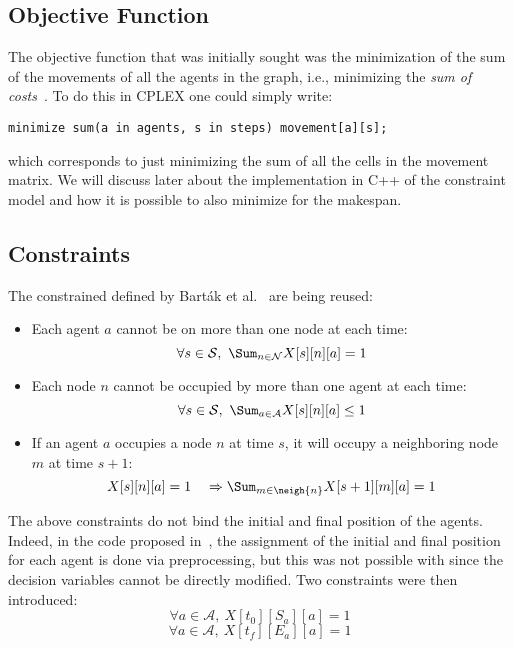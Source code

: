 \subsection{Objective Function}
The objective function that was initially sought was the minimization of the 
sum of the movements of all the agents in the graph, i.e., minimizing the 
\textit{sum of costs}~\cite{picat1}. To do this in CPLEX one could simply 
write:
\begin{verbatim}
minimize sum(a in agents, s in steps) movement[a][s];
\end{verbatim}
which corresponds to just minimizing the sum of all the cells in the movement
matrix. We will discuss later about the implementation in C++ of the constraint
model and how it is possible to also minimize for the makespan. 
%
%
\subsection{Constraints}
The constrained defined by Bart\'{a}k et al.~\cite{picat1} are being reused:
\begin{itemize}
  \item Each agent $a$ cannot be on more than one node at each time:
    \begin{equation}
      \forall s \in \mathcal{S},~\Sum_{n \in \mathcal{N}} X[s][n][a]=1
      \label{eq:picat1_one_agent_one_node}
    \end{equation}
  \item Each node $n$ cannot be occupied by more than one agent at each time:
    \begin{equation}
      \forall s \in \mathcal{S},~\Sum_{a \in \mathcal{A}} X[s][n][a]\leq 1
      \label{eq:picat1_one_node_one_agent}
    \end{equation}
  \item If an agent $a$ occupies a node $n$ at time $s$, it will occupy a
    neighboring node $m$ at time $s+1$:
    \begin{equation}
      X[s][n][a]=1 \quad \Rightarrow \Sum_{m\in \neigh{n}} X[s+1][m][a]=1
      \label{eq:picat1_move_to_neigh}
    \end{equation}
\end{itemize}
The above constraints do not bind the initial and final position of the
agents. Indeed, in the code proposed in~\cite{picat1}, the assignment of
the initial and final position for each agent is done via preprocessing,
but this was not possible with \OPL since the decision variables cannot be
directly modified. Two constraints were then introduced:
\begin{equation}
  \forall a \in \mathcal{A},~X[t_0][S_a][a] = 1
  \label{eq:cplex_init_pos}
\end{equation}
\begin{equation}
  \forall a \in \mathcal{A},~X[t_f][E_a][a] = 1
  \label{eq:cplex_final_pos}
\end{equation}
%
